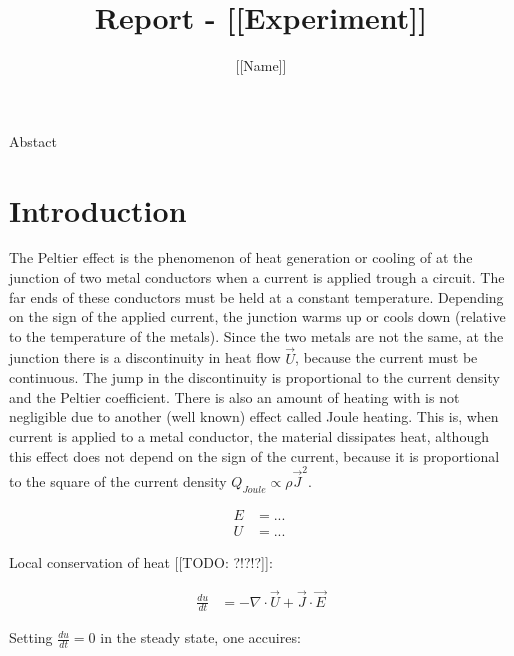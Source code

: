 \documentclass[a4paper]{article}
\author{[[Name]]}
\title{Report - [[Experiment]]}
\begin{document}

\maketitle
\abstract 
Abstact
\section{Introduction}

The Peltier effect is the phenomenon of heat generation or cooling of at the junction of two metal conductors when a current is applied trough a circuit. The far ends of these conductors must be held at a constant temperature. Depending on the sign of the applied current, the junction warms up or cools down (relative to the temperature of the metals). Since the two metals are not the same, at the junction there is a discontinuity in heat flow $\vec{U}$, because the current must be continuous. The jump in the discontinuity is proportional to the current density and the Peltier coefficient.
\newline
There is also an amount of heating with is not negligible due to another (well known) effect called Joule heating. This is, when current is applied to a metal conductor, the material dissipates heat, although this effect does not depend on the sign of the current, because it is proportional to the square of the current density $Q_{Joule} \propto \rho \vec{J}^2$.

\begin{subequations}
\begin{align}
    E &= ... \	\label{eq:E} \\
    U &= ... \	\label{eq:U}
\end{align}
\end{subequations}

Local conservation of heat [[TODO: ?!?!?]]:

\begin{subequations}
\begin{align}
    \frac{du}{dt} 	&= - \nabla \cdot \vec{U} + \vec{J} \cdot \vec{E}
\end{align}
\end{subequations}

Setting $\frac{du}{dt} = 0$ in the steady state, one accuires:
\end{document}
